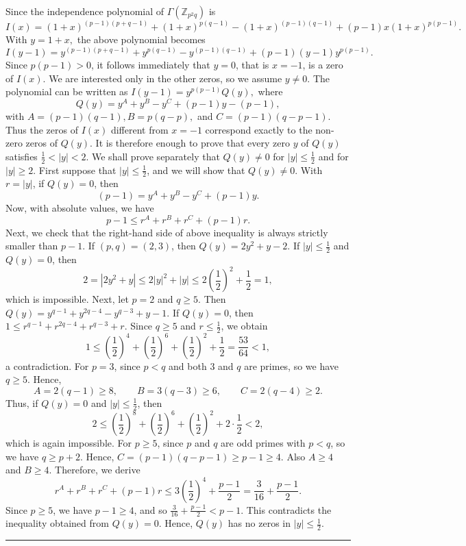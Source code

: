 \documentclass[12pt,twoside]{article}
\renewenvironment{proof}{{\noindent\bfseries Proof.}}{\qed}
\def\qed{\nolinebreak\hfill\rule{.2cm}{.2cm}\par\addvspace{.5cm}}
\begin{document}
\begin{proof}
	Since the independence polynomial of $\varGamma(\mathbb{Z}_{p^{2}q})$ is
	$$
	I(x)
	=
	(1+x)^{(p-1)(p+q-1)}
	+
	(1+x)^{p(q-1)}
	-
	(1+x)^{(p-1)(q-1)}
	+
	(p-1)x(1+x)^{p(p-1)}.
	$$
	With 
	$
	y=1+x,
	$ the above polynomial becomes
	$$
	I(y-1)
	=
	y^{(p-1)(p+q-1)}
	+
	y^{p(q-1)}
	-
	y^{(p-1)(q-1)}
	+
	(p-1)(y-1)y^{p(p-1)}.
	$$
	Since $p(p-1)>0$, it follows immediately that $y=0$, that is $x=-1$, is a zero of $I(x)$. We are interested only in the other zeros, so we assume $y\neq 0$.  The polynomial can be written as $
	I(y-1)
	=
	y^{p(p-1)}Q(y),
	$
	where
	$$
	Q(y)
	=
	y^{A}+y^{B}-y^{C}+(p-1)y-(p-1),
	$$
	with
	$
	A=(p-1)(q-1),
	B=p(q-p),$ and $
	C=(p-1)(q-p-1).
	$
	Thus the zeros of $I(x)$ different from $x=-1$ correspond exactly to the non-zero zeros of $Q(y)$. It is therefore enough to prove that every zero $y$ of $Q(y)$ satisfies
	$
	\tfrac{1}{2}<|y|<2.
	$
	We shall prove separately that $Q(y)\neq 0$ for $|y|\leq \tfrac12$ and for $|y|\geq 2$.
	 First suppose that $|y|\leq \tfrac12$, and we will show that $Q(y)\neq 0$. With $r=|y|$, if $Q(y)=0$, then
	$$
	(p-1)
	=
	y^{A}+y^{B}-y^{C}+(p-1)y.
	$$
	Now, with absolute values, we have
	$$
	p-1
	\leq
	r^{A}+r^{B}+r^{C}+(p-1)r.
	$$
	Next, we check that the right-hand side of above inequality is always strictly smaller than $p-1$.
	 If $(p,q)=(2,3)$, then
	$
	Q(y)=2y^{2}+y-2.
	$
	If $|y|\leq \tfrac12$ and $Q(y)=0$, then
	$$
	2=|2y^{2}+y|\leq 2|y|^{2}+|y|\leq 2\left(\frac12\right)^2+\frac12=1,
	$$
	which is impossible. Next, let $p=2$ and $q\geq 5$. Then
	$
	Q(y)=y^{q-1}+y^{2q-4}-y^{q-3}+y-1.
	$
	If $Q(y)=0$, then
	$
	1
	\leq
	r^{q-1}+r^{2q-4}+r^{q-3}+r.
	$
	Since $q\geq 5$ and $r\leq \frac12$, we obtain
	$$
	1
	\leq
	\left(\frac12\right)^4
	+
	\left(\frac12\right)^6
	+
	\left(\frac12\right)^2
	+
	\frac12
	=
	\frac{53}{64}<1,
	$$
	a contradiction. For $p=3$, since $p<q$ and both $3$ and $q$ are primes, so we have $q\geq 5$. Hence,
	$$
	A=2(q-1)\geq 8,\qquad
	B=3(q-3)\geq 6,\qquad
	C=2(q-4)\geq 2.
	$$
	Thus, if $Q(y)=0$ and $|y|\leq \frac12$, then
	$$
	2
	\leq
	\left(\frac12\right)^8
	+
	\left(\frac12\right)^6
	+
	\left(\frac12\right)^2
	+
	2\cdot\frac12
	<2,
	$$
	which is again impossible. For $p\geq 5$, since $p$ and $q$ are odd primes with $p<q$, so we have $q\geq p+2$. Hence, 
	$
	C=(p-1)(q-p-1)\geq p-1\geq 4.
	$
	Also $A\geq 4$ and $B\geq 4$. Therefore, we derive
	$$
	r^{A}+r^{B}+r^{C}+(p-1)r
	\leq
	3\left(\frac12\right)^4+\frac{p-1}{2}
	=
	\frac{3}{16}+\frac{p-1}{2}.
	$$
	Since $p\geq 5$, we have $p-1\geq 4$, and so
	$
	\frac{3}{16}+\frac{p-1}{2}<p-1.
	$
	This contradicts the inequality obtained from $Q(y)=0$. Hence, $Q(y)$ has no zeros in $|y|\leq \frac12$.
	

\end{proof}
\end{document}
